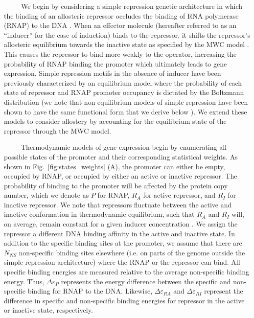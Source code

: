 \documentclass[12pt]{caltech_thesis}
\begin{document}
~~~~~We begin by considering a simple repression genetic architecture in
which the binding of an allosteric repressor occludes the binding of RNA
polymerase (RNAP) to the DNA \autocite{ackers1982,buchler2003}. When an
effector molecule (hereafter referred to as an ``inducer'' for the case
of induction) binds to the repressor, it shifts the repressor's
allosteric equilibrium towards the inactive state as specified by the
MWC model \autocite{monod1965}. This causes the repressor to bind more
weakly to the operator, increasing the probability of RNAP binding the
promoter which ultimately leads to gene expression. Simple repression
motifs in the absence of inducer have been previously characterized by
an equilibrium model where the probability of each state of repressor
and RNAP promoter occupancy is dictated by the Boltzmann distribution
\autocite{ackers1982,buchler2003,vilar2003,bintu2005a,garcia2011,brewster2014}
(we note that non-equilibrium models of simple repression have been
shown to have the same functional form that we derive below
\autocite{phillips2015}). We extend these models to consider allostery
by accounting for the equilibrium state of the repressor through the MWC
model.

~~~~~Thermodynamic models of gene expression begin by enumerating all
possible states of the promoter and their corresponding statistical
weights. As shown in Fig.~\ref{fig:states_weights} (A), the promoter can
either be empty, occupied by RNAP, or occupied by either an active or
inactive repressor. The probability of binding to the promoter will be
affected by the protein copy number, which we denote as \(P\) for RNAP,
\(R_{A}\) for active repressor, and \(R_{I}\) for inactive repressor. We
note that repressors fluctuate between the active and inactive
conformation in thermodynamic equilibrium, such that \(R_{A}\) and
\(R_{I}\) will, on average, remain constant for a given inducer
concentration \autocite{monod1965}. We assign the repressor a different
DNA binding affinity in the active and inactive state. In addition to
the specific binding sites at the promoter, we assume that there are
\(N_{NS}\) non-specific binding sites elsewhere (i.e. on parts of the
genome outside the simple repression architecture) where the RNAP or the
repressor can bind. All specific binding energies are measured relative
to the average non-specific binding energy. Thus,
\(\Delta\varepsilon_{P}\) represents the energy difference between the
specific and non-specific binding for RNAP to the DNA. Likewise,
\(\Delta\varepsilon_{RA}\) and \(\Delta\varepsilon_{RI}\) represent the
difference in specific and non-specific binding energies for repressor
in the active or inactive state, respectively.
\end{document}
